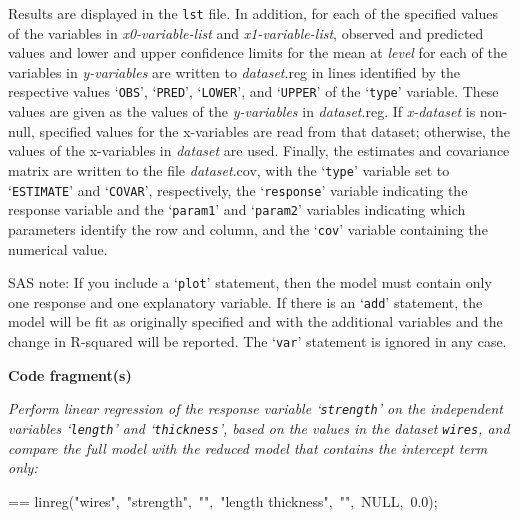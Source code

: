 \documentclass{book}
\makeatletter
\newcommand\Texinfocommandstyletextvar[1]{{\normalfont{}\textsl{#1}}}%
\newenvironment{Texinfopreformatted}{%
  \par\GNUTobeylines\obeyspaces\frenchspacing\parskip=\z@\parindent=\z@}{}
{\catcode`\^^M=13 \gdef\GNUTobeylines{\catcode`\^^M=13 \def^^M{\null\par}}}
\newenvironment{Texinfoindented}{\begin{list}{}{}\item\relax}{\end{list}}
\renewcommand{\_}{\Texinfounderscore\discretionary{}{}{}}
\makeatother
\begin{document}
Results are displayed in the \texttt{lst} file.
In addition, for each of the specified values of the variables in
\Texinfocommandstyletextvar{x0-variable-list} and \Texinfocommandstyletextvar{x1-variable-list},
observed and predicted values and lower and upper confidence limits
for the mean at \Texinfocommandstyletextvar{level} for each of the variables in
\Texinfocommandstyletextvar{y-variables} are written to \Texinfocommandstyletextvar{dataset}.reg
in lines identified by the respective values
`\texttt{OBS}', `\texttt{PRED}', `\texttt{LOWER}', and `\texttt{UPPER}' of the `\texttt{\_type\_}' variable.
These values are given as the values of the \Texinfocommandstyletextvar{y-variables} in \Texinfocommandstyletextvar{dataset}.reg.
If \Texinfocommandstyletextvar{x-dataset} is non-null, specified values for the x-variables
are read from that dataset; otherwise, the values of the x-variables in
\Texinfocommandstyletextvar{dataset} are used.
Finally,
the estimates and covariance matrix are written to the file \Texinfocommandstyletextvar{dataset}.cov,
with the `\texttt{\_type\_}' variable set to `\texttt{ESTIMATE}' and
`\texttt{COVAR}', respectively, the `\texttt{\_response\_}' variable indicating
the response variable and the `\texttt{\_param1\_}'
and `\texttt{\_param2\_}' variables indicating which parameters
identify the row and column, and the `\texttt{\_cov\_}' variable containing the numerical value.

SAS note: If you include a `\texttt{plot}' statement, then the model must contain
only one response and one explanatory variable. If there is an `\texttt{add}'
statement, the model will be fit as originally specified and with the
additional variables and the change in R-squared will be reported.
The `\texttt{var}' statement is ignored in any case.

\noindent{}\textbf{Code fragment(s)}

\emph{Perform linear regression of the response variable `\texttt{strength}'
on the independent variables `\texttt{length}' and `\texttt{thickness}', based
on the values in the dataset \texttt{wires}, and
compare the full model with the reduced model that contains the
intercept term only:}
\begin{Texinfoindented}
\begin{Texinfopreformatted}%
\ttfamily linreg("wires",\ "strength",\ "",\ "length thickness",\ "",\ NULL,\ 0.0);
\end{Texinfopreformatted}
\end{Texinfoindented}
\end{document}
